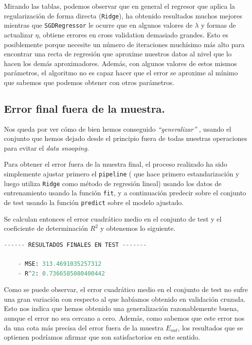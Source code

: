 \documentclass[a4paper, 20pt]{article}
\begin{document}
Mirando las tablas, podemos observar que en general el regresor que aplica la regularización de forma directa (\lstinline{Ridge}), ha obtenido resultados muchos mejores mientras que \lstinline{SGDRegressor} le ocurre que en algunos valores de $\lambda$ y formas de actualizar $\eta$, obtiene errores en cross validation demasiado grandes. Esto es posiblemente porque necesite un número de iteraciones muchísimo más alto para encontrar una recta de regresión que aproxime nuestros datos al nivel que lo hacen los demás aproximadores. Además, con algunos valores de estos mismos parámetros, el algoritmo no es capaz hacer que el error se aproxime al mínimo que sabemos que podemos obtener con otros parámetros.

\subsection{Error final fuera de la muestra.}

Nos queda por ver cómo de bien hemos conseguido \emph{``generalizar''} , usando el conjunto que hemos dejado desde el principio fuera de todas nuestras operaciones para evitar el \emph{data snooping}.

Para obtener el error fuera de la muestra final, el proceso realizado ha sido simplemente ajustar primero  el \lstinline{pipeline} ( que hace primero estandarización y luego utiliza \lstinline{Ridge} como método de regresión lineal) usando los datos de entrenamiento usando la función \lstinline{fit}, y a continuación predecir sobre el conjunto de test usando la función \lstinline{predict} sobre el modelo ajustado.

Se calculan entonces el error cuadrático medio en el conjunto de test y el coeficiente de determinación $R^2$ y obtenemos lo siguiente.


\begin{lstlisting}[language=Python]
  ------ RESULTADOS FINALES EN TEST -------

	- MSE: 313.4691035257312
	- R^2: 0.7366585080400442 

\end{lstlisting}


Como se puede observar, el error cuadrático medio en el conjunto de test no sufre una gran variación con respecto al que habíamos obtenido en validación cruzada. Esto nos indica que hemos obtenido una generalización razonablemente buena, aunque el error no sea cercano a cero. Además, como sabemos que este error nos da una cota más precisa del error fuera de la muestra $E_{out}$, los resultados que se optienen podríamos afirmar que son satisfactorios en este sentido.
\end{document}
